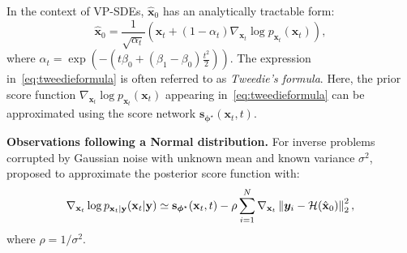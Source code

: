 In the context of VP-SDEs, $\hat{\mathbf{x}}_0$ has an analytically tractable form:
\begin{equation}
\label{eq:tweedieformula}
    \hat{\mathbf{x}}_0 = \frac{1}{\sqrt{\alpha_t} }\left(\mathbf{x}_t + (1-\alpha_t) \nabla_{\mathbf{x}_t} \log p_{\mathbf{x}_t}(\mathbf{x}_t)\right),
\end{equation}
where $\alpha_t = \exp\left(-\left(t \beta_0 + \left(\beta_1 - \beta_0\right) \frac{t^2}{2}\right)\right)$. The expression in~\eqref{eq:tweedieformula}
is often referred to as \textit{Tweedie's formula}. 
Here, the prior score function $\nabla_{\mathbf{x}_t} \log p_{\mathbf{x}_t}(\mathbf{x}_t)$ appearing in~\eqref{eq:tweedieformula} can be approximated using the score network $\mathbf{s}_{\boldsymbol{\phi}^{\star}}(\mathbf{x}_t, t)$. 

\textbf{Observations following a Normal distribution.} For inverse problems corrupted by Gaussian noise with unknown mean and known variance $\sigma^2$, \citet{chung2023} proposed to approximate the posterior score function with:
\begin{equation*}
\nabla_{\mathbf{x}_t}\log p_{\mathbf{x}_t \vert  \mathbf{y}}(\mathbf{x}_t \vert  \mathbf{y}) \simeq \mathbf{s}_{\boldsymbol{\phi}^{\star}}(\mathbf{x}_t, t) - \rho \sum_{i = 1}^N  \nabla_{\mathbf{x}_t} \left\lVert  \boldsymbol{y}_i - \mathcal{H}(\hat{\mathbf{x}}_{0})  \right\rVert_2^2,
\end{equation*}
where $\rho = 1/ \sigma^2$.

